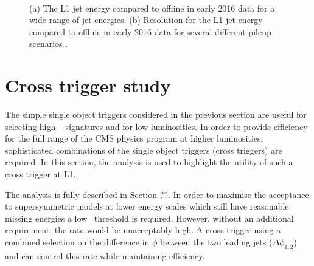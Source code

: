 \begin{figure}
\centering
	~
	\caption{(a) The L1 jet energy compared to offline in early 2016 data for a wide
range of jet energies. (b) Resolution for the L1 jet energy compared to offline in early 2016 data for several different 
pileup scenarios \cite{l1sums_perf}.}
\label{fig:trig_2016}
\end{figure}


\section{Cross trigger study}

The simple single object triggers considered in the previous section are useful for selecting
high \pt~ signatures and for low luminosities. In order to provide efficiency for
the full range of the CMS physics program at higher luminosities, sophisticated combinations
of the single object triggers (cross triggers) are required. In this section, the \alphat 
analysis is used to highlight the utility of such a cross trigger at L1. 

The \alphat analysis is fully described in Section ??. In order to maximise the acceptance
to supersymmetric models at lower energy scales which still have reasonable missing energies
a low \scalht~threshold is required. However, without an additional requirement, the rate
would be unacceptably high. A cross trigger using a combined selection on the difference 
in $\phi$ between the two leading jets ($\Delta\phi_{1,2}$) and \scalht can control this rate while 
maintaining efficiency.

